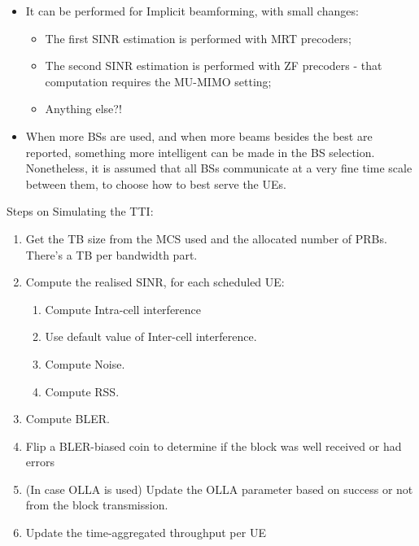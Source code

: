 \begin{itemize}
    
    \item It can be performed for Implicit beamforming, with small changes:
    \begin{itemize}
        \item The first SINR estimation is performed with \ac{MRT} precoders;
        \item The second SINR estimation is performed with \ac{ZF} precoders - that computation requires the MU-MIMO setting;
        \item Anything else?! 
    \end{itemize}

    \item When more BSs are used, and when more beams besides the best are reported, something more intelligent can be made in the BS selection. Nonetheless, it is assumed that all BSs communicate at a very fine time scale between them, to choose how to best serve the UEs.
\end{itemize}





Steps on Simulating the TTI:
\begin{enumerate}
    \item Get the \ac{TB} size from the \ac{MCS} used and the allocated number of \acsp{PRB}. There's a \acs{TB} per bandwidth part.
    \item Compute the realised SINR, for each scheduled \acs{UE}:
    \begin{enumerate}
        \item Compute Intra-cell interference
        \item Use default value of Inter-cell interference.
        \item Compute Noise.
        \item Compute RSS.
    \end{enumerate}
    \item Compute \ac{BLER}.
    \item Flip a \acs{BLER}-biased coin to determine if the block was well received or had errors
    \item (In case \ac{OLLA} is used) Update the \acs{OLLA} parameter based on success or not from the block transmission.
    \item Update the time-aggregated throughput per UE
\end{enumerate}





